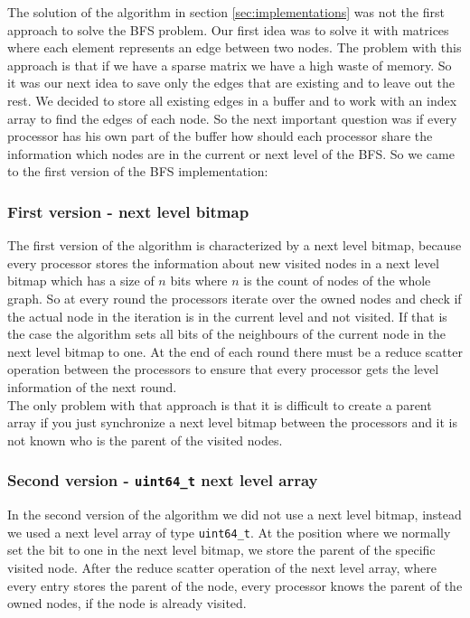 \documentclass[12pt,a4paper]{article}
\begin{document}
The solution of the algorithm in section \ref{sec:implementations} was not the first approach to solve the BFS problem. Our first idea was to solve it with matrices where each element represents an edge between two nodes. The problem with this approach is that if we have a sparse matrix we have a high waste of memory. So it was our next idea to save only the edges that are existing and to leave out the rest. We decided to store all existing edges in a buffer and to work with an index array to find the edges of each node. So the next important question was if every processor has his own part of the buffer how should each processor share the information which nodes are in the current or next level of the BFS. So we came to the first version of the BFS implementation:

\subsubsection{First version - next level bitmap}

The first version of the algorithm is characterized by a next level bitmap, because every processor stores the information about new visited nodes in a next level bitmap which has a size of \(n\) bits where \(n\) is the count of nodes of the whole graph. So at every round the processors iterate over the owned nodes and check if the actual node in the iteration is in the current level and not visited. If that is the case the algorithm sets all bits of the neighbours of the current node in the next level bitmap to one. At the end of each round there must be a reduce scatter operation between the processors to ensure that every processor gets the level information of the next round.\\
The only problem with that approach is that it is difficult to create a parent array if you just synchronize a next level bitmap between the processors and it is not known who is the parent of the visited nodes.

\subsubsection{Second version - \lstinline{uint64_t} next level array}

In the second version of the algorithm we did not use a next level bitmap, instead we used a next level array of type \lstinline{uint64_t}. At the position where we normally set the bit to one in the next level bitmap, we store the parent of the specific visited node. After the reduce scatter operation of the next level array, where every entry stores the parent of the node, every processor knows the parent of the owned nodes, if the node is already visited.
\end{document}
